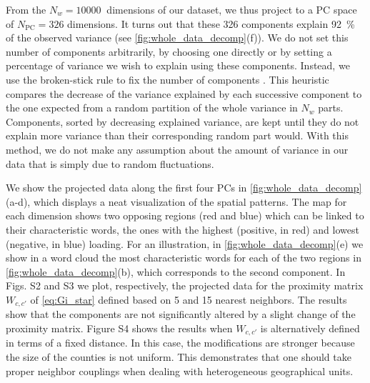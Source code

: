 \documentclass[../thesis.tex]{subfiles}
\begin{document}
From the $N_w = \SI{10000}{}$ dimensions of our dataset, we thus project to a \ac{PC}
space of $N_{\text{PC}} = 326$ dimensions. It turns out that these 326 components
explain 92~\% of the observed variance (see \cref{fig:whole_data_decomp}(f)). We do not
set this number of components arbitrarily, by choosing one directly or by setting a
percentage of variance we wish to explain using these components. Instead, we use the
broken-stick rule to fix the number of components
\cite{FrontierEtudeDecroissance1976,JacksonStoppingRules1993}. This heuristic compares
the decrease of the variance explained by each successive component to the one expected
from a random partition of the whole variance in $N_w$ parts. Components, sorted by
decreasing explained variance, are kept until they do not explain more variance than
their corresponding random part would. With this method, we do not make any assumption
about the amount of variance in our data that is simply due to random fluctuations.

We show the projected data along the first four \acp{PC} in
\cref{fig:whole_data_decomp}(a-d), which displays a neat visualization of the spatial
patterns. The map for each dimension shows two opposing regions (red and blue) which can
be linked to their characteristic words, the ones with the highest (positive, in red)
and lowest (negative, in blue) loading. For an illustration, in
\cref{fig:whole_data_decomp}(e) we show in a word cloud the most characteristic words
for each of the two regions in \cref{fig:whole_data_decomp}(b), which corresponds to the
second component. In Figs. S2 and S3 we plot, respectively, the projected data for the
proximity matrix $W_{c, c'}$ of \cref{eq:Gi_star} defined based on 5 and 15 nearest
neighbors. The results show that the components are not significantly altered by a
slight change of the proximity matrix. Figure S4 shows the results when $W_{c, c'}$ is
alternatively defined in terms of a fixed distance. In this case, the modifications are
stronger because the size of the counties is not uniform. This demonstrates that one
should take proper neighbor couplings when dealing with heterogeneous geographical
units.
\end{document}
